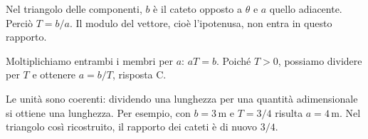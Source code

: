 \documentclass[11pt,a4paper]{article}
\begin{document}
\begin{samepage}
Nel triangolo delle componenti, \(b\) è il cateto opposto a \(\theta\) e \(a\) quello adiacente. Perciò \(T=b/a\). Il modulo del vettore, cioè l’ipotenusa, non entra in questo rapporto.\par

Moltiplichiamo entrambi i membri per \(a\): \(aT=b\). Poiché \(T>0\), possiamo dividere per \(T\) e ottenere \(a=b/T\), risposta C.\par

Le unità sono coerenti: dividendo una lunghezza per una quantità adimensionale si ottiene una lunghezza. Per esempio, con \(b=3\,\mathrm{m}\) e \(T=3/4\) risulta \(a=4\,\mathrm{m}\). Nel triangolo così ricostruito, il rapporto dei cateti è di nuovo \(3/4\).\par

\end{samepage}
\newpage
\end{document}
